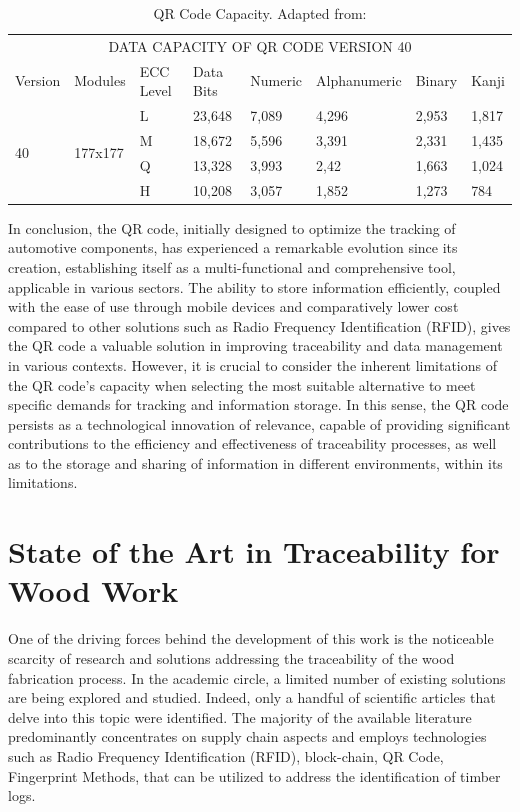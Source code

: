 \begin{table}[!ht]
\begin{tabular}{llllllll}
\hline
\multicolumn{8}{c}{DATA CAPACITY OF QR CODE VERSION 40 } \\
\cline{1-8}

Version             & Modules                  & ECC Level & Data Bits & Numeric & Alphanumeric & Binary & Kanji \\
\cline{1-8}


\multirow{4}{*}{40} & \multirow{4}{*}{177x177} & L         & 23,648    & 7,089   & 4,296        & 2,953 & 1,817 \\
                    &                          & M         & 18,672    & 5,596   & 3,391        & 2,331 & 1,435 \\
                    &                          & Q         & 13,328    & 3,993   & 2,42         & 1,663 & 1,024 \\
                    &                          & H         & 10,208    & 3,057   & 1,852        & 1,273 & 784 \\
\cline{1-8}
\end{tabular}
\caption{QR Code Capacity. Adapted from: \cite{Tiwari2016}}
\label{tab:qrcode-capacity}
\end{table}

In conclusion, the QR code, initially designed to optimize the tracking of automotive components, has experienced a remarkable evolution since its creation, establishing itself as a multi-functional and comprehensive tool, applicable in various sectors. The ability to store information efficiently, coupled with the ease of use through mobile devices and comparatively lower cost compared to other solutions such as Radio Frequency Identification (RFID), gives the QR code a valuable solution in improving traceability and data management in various contexts. However, it is crucial to consider the inherent limitations of the QR code's capacity when selecting the most suitable alternative to meet specific demands for tracking and information storage. In this sense, the QR code persists as a technological innovation of relevance, capable of providing significant contributions to the efficiency and effectiveness of traceability processes, as well as to the storage and sharing of information in different environments, within its limitations.

\section{State of the Art in Traceability for Wood Work}\label{section:stateOfArt}
One of the driving forces behind the development of this work is the noticeable scarcity of research and solutions addressing the traceability of the wood fabrication process. In the academic circle, a limited number of existing solutions are being explored and studied. Indeed, only a handful of scientific articles that delve into this topic were identified. The majority of the available literature predominantly concentrates on supply chain aspects and employs technologies such as Radio Frequency Identification (RFID),  block-chain, QR Code, Fingerprint Methods, that can be utilized to address the identification of timber logs.


